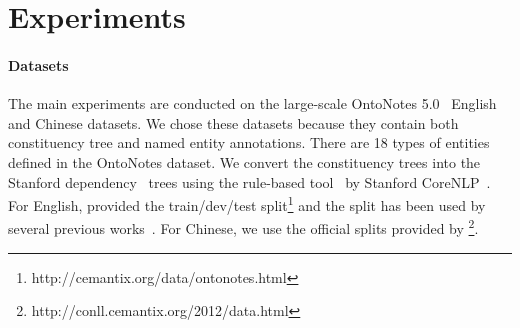 \section{Experiments}




\paragraph{Datasets}
The main experiments are conducted on the large-scale OntoNotes 5.0~\cite{weischedel2013ontonotes} English and Chinese datasets.
We chose these datasets  because  they contain both constituency tree and named entity annotations. 
There are 18 types of entities defined in the OntoNotes dataset. 
We convert the constituency trees into the Stanford dependency~\cite{de2008stanford} trees using the rule-based tool~\cite{de2006generating} by Stanford CoreNLP~\cite{manning2014stanford}.
For English, \citet{pradhan2013towards} provided the train/dev/test split\footnote{http://cemantix.org/data/ontonotes.html} and the split has been used by several previous works~\cite{chiu2016named,li2017leveraging,ghaddar2018robust}.
For Chinese, we use the official splits provided by \citet{pradhan2012conll}\footnote{http://conll.cemantix.org/2012/data.html}.


